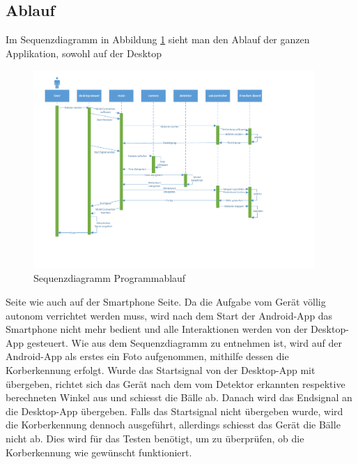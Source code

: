 \subsection{Ablauf}


Im Sequenzdiagramm in Abbildung \ref{abb:SequenzdiagrammSoftware} sieht man den Ablauf der ganzen Applikation, sowohl auf der Desktop \begin{figure}[h!]
	\includegraphics[width=0.95\textwidth,clip,trim=12mm 35mm 55mm 5mm]
	{Enddokumentation/Bilder/Sequenzdiagramm_PREN2_v1.pdf}
	\centering
	\caption{Sequenzdiagramm Programmablauf}
	\label{abb:SequenzdiagrammSoftware}
\end{figure}
Seite wie auch auf der Smartphone Seite. Da die Aufgabe vom Gerät völlig autonom verrichtet 
werden muss, wird nach dem Start der Android-App das Smartphone nicht mehr bedient 
und alle Interaktionen werden von der Desktop-App gesteuert. 
Wie aus dem Sequenzdiagramm zu entnehmen ist, wird auf der Android-App als erstes ein 
Foto aufgenommen, mithilfe dessen die Korberkennung erfolgt. 
Wurde das Startsignal von der Desktop-App mit übergeben, richtet sich das Gerät nach dem vom Detektor erkannten 
respektive berechneten Winkel aus und schiesst die Bälle ab. 
Danach wird das Endsignal an die Desktop-App übergeben.
Falls das Startsignal nicht übergeben wurde, wird die Korberkennung dennoch ausgeführt, 
allerdings schiesst das Gerät die Bälle nicht ab. Dies wird für das Testen benötigt, um 
zu überprüfen, ob die Korberkennung wie gewünscht funktioniert.       
